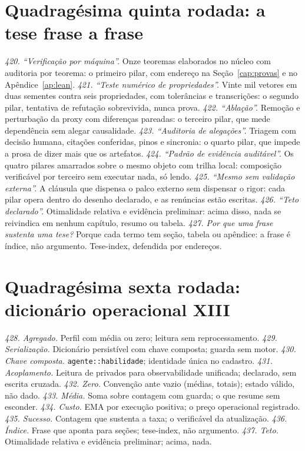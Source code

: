 \section{Quadragésima quinta rodada: a tese frase a frase}
\textit{420. ``Verificação por máquina''.} Onze teoremas elaborados no núcleo com auditoria por teorema: o primeiro pilar, com endereço na Seção~\ref{cap:provas} e no Apêndice~\ref{ap:lean}.
\textit{421. ``Teste numérico de propriedades''.} Vinte mil vetores em duas sementes contra seis propriedades, com tolerâncias e transcrições: o segundo pilar, tentativa de refutação sobrevivida, nunca prova.
\textit{422. ``Ablação''.} Remoção e perturbação da proxy com diferenças pareadas: o terceiro pilar, que mede dependência sem alegar causalidade.
\textit{423. ``Auditoria de alegações''.} Triagem com decisão humana, citações conferidas, pinos e sincronia: o quarto pilar, que impede a prosa de dizer mais que os artefatos.
\textit{424. ``Padrão de evidência auditável''.} Os quatro pilares amarrados sobre o mesmo objeto com trilha local: composição verificável por terceiro sem executar nada, só lendo.
\textit{425. ``Mesmo sem validação externa''.} A cláusula que dispensa o palco externo sem dispensar o rigor: cada pilar opera dentro do desenho declarado, e as renúncias estão escritas.
\textit{426. ``Teto declarado''.} Otimalidade relativa e evidência preliminar: acima disso, nada se reivindica em nenhum capítulo, resumo ou tabela.
\textit{427. Por que uma frase sustenta uma tese?} Porque cada termo tem seção, tabela ou apêndice: a frase é índice, não argumento. Tese-index, defendida por endereços.
\section{Quadragésima sexta rodada: dicionário operacional XIII}
\textit{428. Agregado.} Perfil com média ou zero; leitura sem reprocessamento.
\textit{429. Serialização.} Dicionário persistível com chave composta; guarda sem motor.
\textit{430. Chave composta.} \texttt{agente::habilidade}; identidade única no cadastro.
\textit{431. Acoplamento.} Leitura de privados para observabilidade unificada; declarado, sem escrita cruzada.
\textit{432. Zero.} Convenção ante vazio (médias, totais); estado válido, não dado.
\textit{433. Média.} Soma sobre contagem com guarda; o que resume sem esconder.
\textit{434. Custo.} EMA por execução positiva; o preço operacional registrado.
\textit{435. Sucesso.} Contagem que sustenta a taxa; o verificável da atualização.
\textit{436. Índice.} Frase que aponta para seções; tese-index, não argumento.
\textit{437. Teto.} Otimalidade relativa e evidência preliminar; acima, nada.
